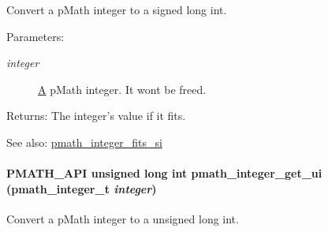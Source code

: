 Convert a pMath integer to a signed long int. 

\begin{Desc}
\item[Parameters:]
\begin{description}
\item[{\em integer}]\hyperlink{class_a}{A} pMath integer. It wont be freed. \end{description}
\end{Desc}
\begin{Desc}
\item[Returns:]The integer's value if it fits.\end{Desc}
\begin{Desc}
\item[See also:]\hyperlink{group__numbers_gc220e06754067b9ba4a7c823017ad32e}{pmath\_\-integer\_\-fits\_\-si} \end{Desc}
\hypertarget{group__numbers_g0aed3b6f38410b7e42ffa52be73c6ea6}{
\paragraph[{pmath\_\-integer\_\-get\_\-ui}]{\setlength{\rightskip}{0pt plus 5cm}PMATH\_\-API unsigned long int pmath\_\-integer\_\-get\_\-ui ({\bf pmath\_\-integer\_\-t} {\em integer})}\hfill}
\label{group__numbers_g0aed3b6f38410b7e42ffa52be73c6ea6}


Convert a pMath integer to a unsigned long int. 

